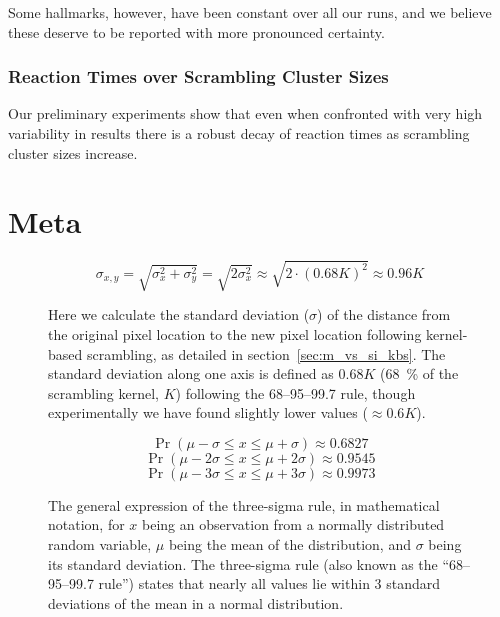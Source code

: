 	Some hallmarks, however, have been constant over all our runs, and we believe these deserve to be reported with more pronounced certainty.
	\subsection{Reaction Times over Scrambling Cluster Sizes}
	    Our preliminary experiments show that even when confronted with very high variability in results there is a robust decay of reaction times as scrambling cluster sizes increase. 
\chapter{Meta}
    \begin{figure}[H]
	\[ \sigma_{x,y} = \sqrt{\sigma_{x}^{2}+\sigma_{y}^{2}} = \sqrt{2\sigma_{x}^{2}} \approx \sqrt{2 \cdot (0.68 K)^{2}} \approx 0.96K\]
	\caption{Here we calculate the standard deviation ($\sigma$) of the distance from the original pixel location to the new pixel location following kernel-based scrambling, as detailed in section~\ref{sec:m_vs_si_kbs}. The standard deviation along one axis is defined as $0.68K$ (\SI{68}{\percent} of the scrambling kernel, $K$) following the 68–95–99.7 rule, though experimentally we have found slightly lower values ($\approx 0.6K$).}\label{eq:lrgn}
    \end{figure}
    \begin{figure}[H]
	\[\Pr(\mu - \sigma \le x \le \mu + \sigma) \approx 0.6827 \]
	\[\Pr(\mu - 2\sigma \le x \le \mu + 2\sigma) \approx 0.9545 \]
	\[\Pr(\mu - 3\sigma \le x \le \mu + 3\sigma) \approx 0.9973 \]
	\caption{The general expression of the three-sigma rule, in mathematical notation, for $x$ being an observation from a normally distributed random variable, $\mu$ being the mean of the distribution, and $\sigma$ being its standard deviation. The three-sigma rule (also known as the “68–95–99.7 rule”) states that nearly all values lie within 3 standard deviations of the mean in a normal distribution.}\label{eq:3s}
    \end{figure}
